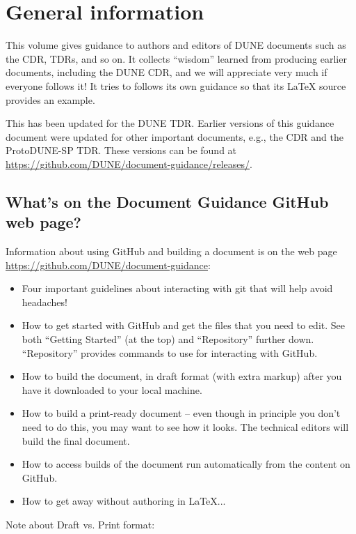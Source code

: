 \chapter{General information}
\label{ch:gen}

This volume gives guidance to authors and editors of DUNE documents such as the CDR, TDRs, and so on. It collects ``wisdom'' learned from 
producing earlier documents, including the DUNE CDR, and we will appreciate 
very much if everyone follows it!  It tries to follows its own guidance so that its \LaTeX{} source
provides an example.  

This has been updated for the DUNE TDR. Earlier versions of this guidance document were updated for other important documents, e.g., the CDR and the ProtoDUNE-SP TDR.  These versions can be found at \url{https://github.com/DUNE/document-guidance/releases/}.


\section{What's on the Document Guidance GitHub web page?}
\label{sec:gen-webpage}

Information about using GitHub and building a document is on the web page \url{https://github.com/DUNE/document-guidance}:

\begin{itemize}
\item Four important guidelines about interacting with git that will help avoid headaches!
\item How to get started with GitHub and get the files that you need to edit. See both ``Getting Started'' (at the top) and ``Repository'' further down.  ``Repository'' provides commands to use for interacting with GitHub.
\item How to build the document, in draft format (with extra markup) after you have it downloaded to your local machine.
\item How to build a print-ready document -- even though in principle you don't need to do this, you may want to see how it looks. The technical editors will build the final document.
\item How to access builds of the document run automatically from the content on GitHub.
\item How to get away without authoring in \LaTeX{}...
\end{itemize}

Note about Draft vs. Print format: 

